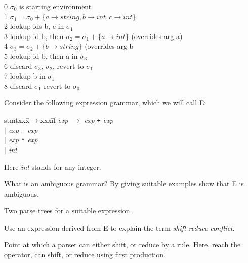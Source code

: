 \documentclass[11pt]{cityexam}
\begin{document}
\begin{questions}
\begin{subquestions}
\begin{modelanswer}
0 $\sigma_0$ is starting environment\\
1 $\sigma_1 = \sigma_0 + \{a\rightarrow string,b\rightarrow int,c\rightarrow int\}$\\
2 lookup ids b, c  in $\sigma_1$\\
3 lookup id b, then $\sigma_2 = \sigma_1 + \{a\rightarrow int\}$ (overrides arg a)\\
4 $\sigma_3 = \sigma_2 + \{b\rightarrow string\}$ (overrides arg b\\
5 lookup id b, then a in $\sigma_3$\\
6 discard $\sigma_3$, $\sigma_2$, revert to $\sigma_1$\\
7 lookup b in $\sigma_1$\\
8 discard $\sigma_1$ revert to $\sigma_0$
\end{modelanswer}


\end{subquestions}

\newpage

\question

Consider the following expression grammar, which we will call E:
\begin{tabbing}
stmtxxx\=$\rightarrow$xxx\=if\kill
\it
exp \> $\rightarrow$ \> {\it exp\/} \verb!+! {\it exp} \\
\it
     \> $\mid$ \> {\it exp\/} \verb!-! {\it exp\/} \\
     \> $\mid$ \> {\it exp\/} \verb!*! {\it exp\/} \\
     \> $\mid$ \> {\it int}
\end{tabbing}
Here {\it int\/} stands for any integer.

\begin{subquestions}

\subquestion
What is an ambiguous grammar?
By giving suitable examples show that E is ambiguous.

\begin{modelanswer}
Two parse trees for a suitable expression.
\end{modelanswer}

\subquestion
Use an expression derived from E to explain the
term {\em shift-reduce conflict\/}.

\begin{modelanswer}
Point at which a parser can either shift, or reduce by a rule. 
Here, reach the operator, can shift, or reduce using first production.
\end{modelanswer}


\end{subquestions}
\end{questions}
\end{document}

